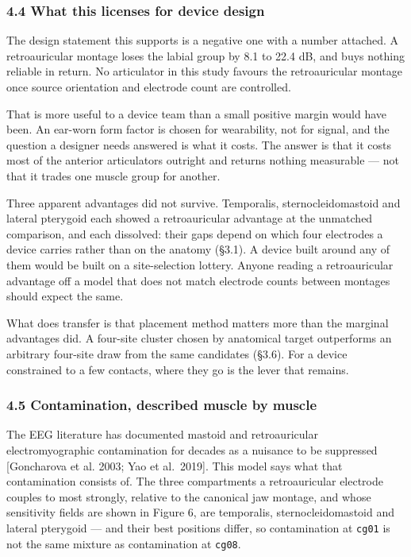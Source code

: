 \documentclass[
  11pt,
]{article}
\begin{document}
\subsubsection{4.4 What this licenses for device design}\label{what-this-licenses-for-device-design}

The design statement this supports is a negative one with a number attached. A
retroauricular montage loses the labial group by 8.1 to 22.4 dB, and buys
nothing reliable in return. No articulator in this study favours the
retroauricular montage once source orientation and electrode count are
controlled.

That is more useful to a device team than a small positive margin would have
been. An ear-worn form factor is chosen for wearability, not for signal, and the
question a designer needs answered is what it costs. The answer is that it costs
most of the anterior articulators outright and returns nothing measurable --- not
that it trades one muscle group for another.

Three apparent advantages did not survive. Temporalis, sternocleidomastoid and
lateral pterygoid each showed a retroauricular advantage at the unmatched
comparison, and each dissolved: their gaps depend on which four electrodes a
device carries rather than on the anatomy (§3.1). A device built around any of
them would be built on a site-selection lottery. Anyone reading a retroauricular
advantage off a model that does not match electrode counts between montages
should expect the same.

What does transfer is that placement method matters more than the marginal
advantages did. A four-site cluster chosen by anatomical target outperforms an
arbitrary four-site draw from the same candidates (§3.6). For a device
constrained to a few contacts, where they go is the lever that remains.

\subsubsection{4.5 Contamination, described muscle by muscle}\label{contamination-described-muscle-by-muscle}

The EEG literature has documented mastoid and retroauricular electromyographic
contamination for decades as a nuisance to be suppressed {[}Goncharova et al.
2003; Yao et al.~2019{]}. This model says what that contamination consists of. The
three compartments a retroauricular electrode couples to most strongly, relative
to the canonical jaw montage, and whose sensitivity fields are shown in Figure 6,
are temporalis, sternocleidomastoid and lateral
pterygoid --- and their best positions differ, so contamination at \texttt{cg01} is not
the same mixture as contamination at \texttt{cg08}.
\end{document}
